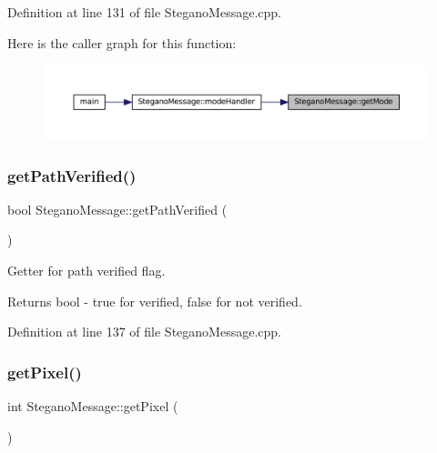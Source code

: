 Definition at line 131 of file Stegano\+Message.\+cpp.

Here is the caller graph for this function\+:
\nopagebreak
\begin{figure}[H]
\begin{center}
\leavevmode
\includegraphics[width=350pt]{classSteganoMessage_a7dc660e6d2c8f162636f789cfedde67e_icgraph}
\end{center}
\end{figure}
\mbox{\label{classSteganoMessage_ace172144e49a4da69b890958b3b8089b}} 
\subsubsection{\texorpdfstring{getPathVerified()}{getPathVerified()}}
{\footnotesize\ttfamily bool Stegano\+Message\+::get\+Path\+Verified (\begin{DoxyParamCaption}{ }\end{DoxyParamCaption})}



Getter for path verified flag. 

\begin{DoxyReturn}{Returns}
bool -\/ true for verified, false for not verified. 
\end{DoxyReturn}


Definition at line 137 of file Stegano\+Message.\+cpp.

\mbox{\label{classSteganoMessage_a12231d3596b90fe4c6d67bd694b27d07}} 
\subsubsection{\texorpdfstring{getPixel()}{getPixel()}}
{\footnotesize\ttfamily int Stegano\+Message\+::get\+Pixel (\begin{DoxyParamCaption}{ }\end{DoxyParamCaption})\hspace{0.3cm}{\ttfamily [private]}}



